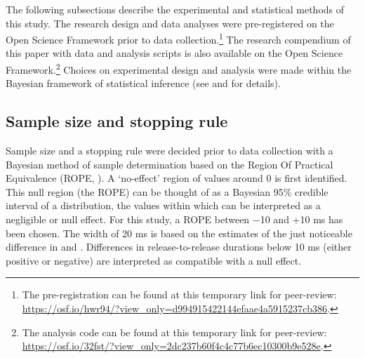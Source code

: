 \documentclass[12pt,a4paper,]{article}
\begin{document}
The following subsections describe the experimental and statistical
methods of this study. The research design and data analyses were
pre-registered on the Open Science Framework prior to data
collection.\footnote{The pre-registration can be found at this temporary link for peer-review: \url{https://osf.io/hwr94/?view_only=d994915422144efaae4a5915237cb386}.}
The research compendium of this paper with data \citep{coretta2019g} and
analysis scripts is also available on the Open Science
Framework.\footnote{The analysis code can be found at this temporary link for peer-review: \url{https://osf.io/32fst/?view_only=2dc237b60f4c4c77b6ec10300b9e528e}.}
Choices on experimental design and analysis were made within the
Bayesian framework of statistical inference (see 
and  for details).

\hypertarget{sample-size-and-stopping-rule}{%
\subsection{Sample size and stopping
rule}\label{sample-size-and-stopping-rule}}

\label{s:sample-size}

Sample size and a stopping rule were decided prior to data collection
with a Bayesian method of sample determination based on the Region Of
Practical Equivalence (ROPE, \citealt{kruschke2015, vasishth2018a}). A
`no-effect' region of values around 0 is first identified. This null
region (the ROPE) can be thought of as a Bayesian 95\% credible interval
of a distribution, the values within which can be interpreted as a
negligible or null effect. For this study, a ROPE between −10 and +10 ms
has been chosen. The width of 20 ms is based on the estimates of the
just noticeable difference in \citet{huggins1972} and
\citet{nooteboom1980}. Differences in release-to-release durations below
10 ms (either positive or negative) are interpreted as compatible with a
null effect.
\end{document}
